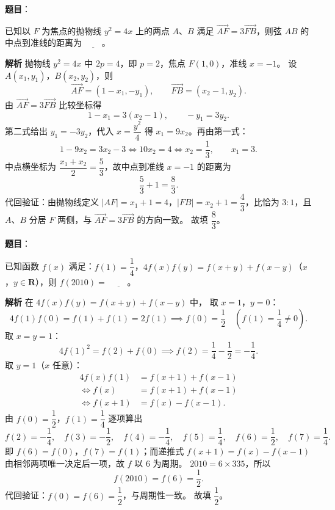 \begin{answer}

\textbf{题目}：

已知以 $F$ 为焦点的抛物线 $y^2=4x$ 上的两点 $A$、$B$ 满足 $\overrightarrow{AF}=3\overrightarrow{FB}$，则弦 $AB$ 的中点到准线的距离为 $\underline{\qquad}$。

\textbf{解析}
抛物线 $y^2=4x$ 中 $2p=4$，即 $p=2$，焦点 $F(1,0)$，准线 $x=-1$。
设 $A\left(x_1,y_1\right)$，$B\left(x_2,y_2\right)$，则
\nopagebreak[4]
\[\overrightarrow{AF}=\left(1-x_1,-y_1\right),\qquad\overrightarrow{FB}=\left(x_2-1,y_2\right).\]
由 $\overrightarrow{AF}=3\overrightarrow{FB}$ 比较坐标得
\nopagebreak[4]
\[1-x_1=3\left(x_2-1\right),\qquad -y_1=3y_2.\]
第二式给出 $y_1=-3y_2$，代入 $x=\dfrac{y^2}{4}$ 得 $x_1=9x_2$。再由第一式：
\nopagebreak[4]
\[1-9x_2=3x_2-3\iff 10x_2=4\iff x_2=\frac13,\qquad x_1=3.\]
中点横坐标为 $\dfrac{x_1+x_2}{2}=\dfrac{5}{3}$，故中点到准线 $x=-1$ 的距离为
\nopagebreak[4]
\[\frac53+1=\frac83.\]
代回验证：由抛物线定义 $\left|AF\right|=x_1+1=4$，$\left|FB\right|=x_2+1=\dfrac43$，比恰为 $3:1$，且 $A$、$B$ 分居 $F$ 两侧，与 $\overrightarrow{AF}=3\overrightarrow{FB}$ 的方向一致。
故填 $\dfrac83$。


\end{answer}
\begin{answer}

\textbf{题目}：

已知函数 $f(x)$ 满足：$f(1)=\dfrac14$，$4f(x)f(y)=f(x+y)+f(x-y)$（$x$，$y\in\mathbf R$），则 $f(2010)=$ $\underline{\qquad}$。

\textbf{解析}
在 $4f(x)f(y)=f(x+y)+f(x-y)$ 中，
取 $x=1$，$y=0$：
\nopagebreak[4]
\[4f(1)f(0)=f(1)+f(1)=2f(1)\implies f(0)=\frac12\quad\left(f(1)=\frac14\neq0\right).\]
取 $x=y=1$：
\nopagebreak[4]
\[4f(1)^2=f(2)+f(0)\implies f(2)=\frac14-\frac12=-\frac14.\]
取 $y=1$（$x$ 任意）：
\nopagebreak[4]
\[\begin{aligned}
4f(x)f(1)&=f(x+1)+f(x-1)\\
\iff f(x)&=f(x+1)+f(x-1)\\
\iff f(x+1)&=f(x)-f(x-1).
\end{aligned}\]
由 $f(0)=\dfrac12$，$f(1)=\dfrac14$ 逐项算出
\nopagebreak[4]
\[f(2)=-\frac14,\quad f(3)=-\frac12,\quad f(4)=-\frac14,\quad f(5)=\frac14,\quad f(6)=\frac12,\quad f(7)=\frac14.\]
即 $f(6)=f(0)$，$f(7)=f(1)$；而递推式 $f(x+1)=f(x)-f(x-1)$ 由相邻两项唯一决定后一项，故 $f$ 以 $6$ 为周期。
$2010=6\times335$，所以
\nopagebreak[4]
\[f(2010)=f(6)=\frac12.\]
代回验证：$f(0)=f(6)=\dfrac12$，与周期性一致。
故填 $\dfrac12$。


\end{answer}
